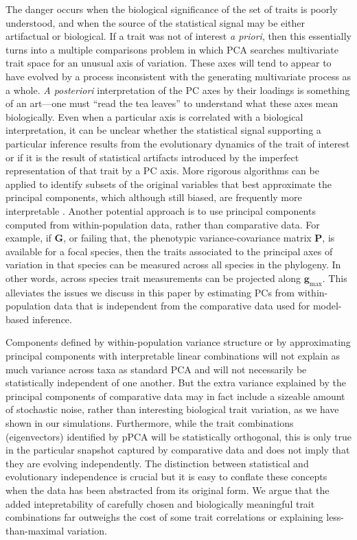 \documentclass[a4paper,11pt]{article}
\begin{document}
The danger occurs when the biological significance of the set of traits is poorly understood, and when the source of the statistical signal may be either artifactual or biological. If a trait was not of interest \textit{a priori}, then this essentially turns into a multiple comparisons problem in which PCA searches multivariate trait space for an unusual axis of variation. These axes will tend to appear to have evolved by a process inconsistent with the generating multivariate process as a whole. \textit{A posteriori} interpretation of the PC axes by their loadings is something of an art---one must ``read the tea leaves'' to understand what these axes mean biologically. Even when a particular axis is correlated with a biological interpretation, it can be unclear whether the statistical signal supporting a particular inference results from the evolutionary dynamics of the trait of interest or if it is the result of statistical artifacts introduced by the imperfect representation of that trait by a PC axis. More rigorous algorithms can be applied to identify subsets of the original variables that best approximate the principal components, which although still biased, are frequently more interpretable \citep{Hausman1982,Somers1986, Somers1989, Vines2000, Cadima2001,Jolliffe2002, Zou2006}. Another potential approach is to use principal components computed from within-population data, rather than comparative data. For example, if $\mathbf{G}$, or failing that, the phenotypic variance-covariance matrix $\mathbf{P}$, is available for a focal species, then the traits associated to the principal axes of variation in that species can be measured across all species in the phylogeny. In other words, across species trait measurements can be projected along $\mathbf{g}_{\text{max}}$. This alleviates the issues we discuss in this paper by estimating PCs from within-population data that is independent from the comparative data used for model-based inference.  

Components defined by within-population variance structure or by approximating principal components with interpretable linear combinations will not explain as much variance across taxa as standard PCA and will not necessarily be statistically independent of one another. But the extra variance explained by the principal components of comparative data may in fact include a sizeable amount of stochastic noise, rather than interesting biological trait variation, as we have shown in our simulations. Furthermore, while the trait combinations (eigenvectors) identified by pPCA will be statistically orthogonal, this is only true in the particular snapshot captured by comparative data and does not imply that they are evolving independently. The distinction between statistical and evolutionary independence is crucial \citep{HansenHoule2008} but it is easy to conflate these concepts when the data has been abstracted from its original form.  We argue that the added intepretability of carefully chosen and biologically meaningful trait combinations far outweighs the cost of some trait correlations or explaining less-than-maximal variation.
\end{document}
